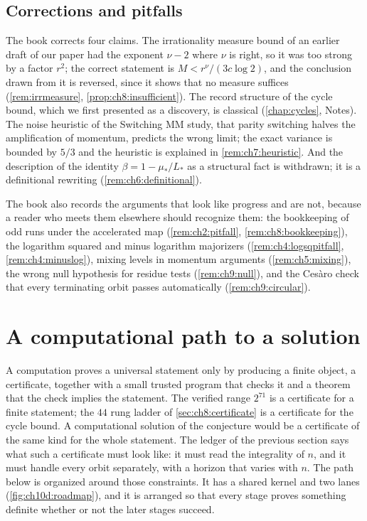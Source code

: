 \subsection*{Corrections and pitfalls}

The book corrects four claims. The irrationality measure bound of an earlier draft of our
paper had the exponent $\nu-2$ where $\nu$ is right, so it was too strong by a factor $r^2$; the correct statement is
$M<r^\nu/(3c\log2)$, and the conclusion drawn from it is reversed, since it
shows that no measure suffices (\cref{rem:irrmeasure}, \cref{prop:ch8:insufficient}).
The record structure of the cycle bound, which we first presented as a
discovery, is classical (\cref{chap:cycles}, Notes). The noise heuristic of the
Switching MM study, that parity switching halves the amplification of
momentum, predicts the wrong limit; the exact variance is bounded by $5/3$ and
the heuristic is explained in \cref{rem:ch7:heuristic}. And the description
of the identity $\beta=1-\mu_\ast/L_\ast$ as a structural fact is withdrawn; it
is a definitional rewriting (\cref{rem:ch6:definitional}).

The book also records the arguments that look like progress and are not,
because a reader who meets them elsewhere should recognize them: the
bookkeeping of odd runs under the accelerated map (\cref{rem:ch2:pitfall},
\cref{rem:ch8:bookkeeping}), the logarithm squared and minus logarithm
majorizers (\cref{rem:ch4:logsqpitfall}, \cref{rem:ch4:minuslog}), mixing
levels in momentum arguments (\cref{rem:ch5:mixing}), the wrong null hypothesis
for residue tests (\cref{rem:ch9:null}), and the Ces\`aro check that every
terminating orbit passes automatically (\cref{rem:ch9:circular}).

\section{A computational path to a solution}\label{sec:ch10d:path}

A computation proves a universal statement only by producing a finite object,
a certificate, together with a small trusted program that checks it and a
theorem that the check implies the statement. The verified range $2^{71}$ is a
certificate for a finite statement; the $44$ rung ladder of
\cref{sec:ch8:certificate} is a certificate for the cycle bound. A computational
solution of the conjecture would be a certificate of the same kind for the
whole statement. The ledger of the previous section says what such a
certificate must look like: it must read the integrality of $n$, and it must
handle every orbit separately, with a horizon that varies with $n$. The path
below is organized around those constraints. It has a shared kernel and two
lanes (\cref{fig:ch10d:roadmap}), and it is arranged so that every stage
proves something definite whether or not the later stages succeed.

